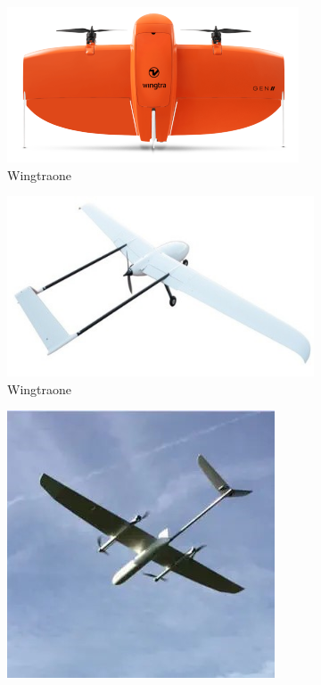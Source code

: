 \documentclass[12 pt]{article}
\begin{document}
\begin{figure}[h!]
    \begin{subfigure}{.4\textwidth}
        \centering
        \includegraphics[width = 0.8\linewidth]{Aircraft pics/WingtraOne.png}
        \caption{Wingtraone}
    \end{subfigure}
    \begin{subfigure}{.4\textwidth}
        \centering
        \includegraphics[width = 0.8\linewidth]{Aircraft pics/Albatross.jpg}
        \caption{Wingtraone}
    \end{subfigure}
    \begin{subfigure}{.4\textwidth}
    \centering
    \includegraphics[width=0.8\linewidth]{Aircraft pics/Azimut.jpg}

\end{subfigure}
\end{figure}
\end{document}
